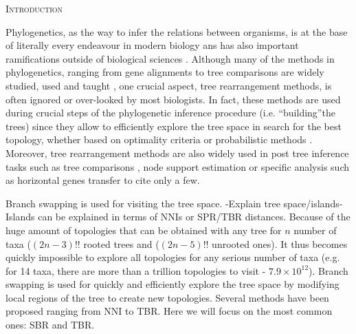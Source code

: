 \documentclass[12pt,letterpaper]{article}
\renewcommand{\section}[1]{%
\bigskip
\begin{center}
\begin{Large}
\normalfont\scshape #1
\medskip
\end{Large}
\end{center}}
\begin{document}
\section{Introduction}

Phylogenetics, as the way to infer the relations between organisms, is at the base of literally every endeavour in modern biology ans has also important ramifications outside of biological sciences \citep[e.g. linguistics;][]{Bouckaert24082012}.
Although many of the methods in phylogenetics, ranging from gene alignments \citep[e.g.][]{Tan01092015} to tree comparisons \citep[e.g.][]{kuhner2015treComparison} are widely studied, used and taught \citep{desalle2012phylogenomics}, one crucial aspect, tree rearrangement methods, is often ignored or over-looked by most biologists.
In fact, these methods are used during crucial steps of the phylogenetic inference procedure (i.e. ``building''the trees) since they allow to efficiently explore the tree space \citep[see ]{Sanderson448} in search for the best topology, whether based on optimality criteria \citep[e.g. maximum parsimony; ][]{swofford2003paup} or probabilistic methods \citep[e.g. likelihood or Bayesian; ][]{Stamatakis21012014,Ronquist2012mrbayes}.
Moreover, tree rearrangement methods are also widely used in post tree inference tasks such as tree comparisons \citep[e.g.][]{allen2001subtree,kuhner2015treComparison}, node support estimation \citep[e.g][]{goloboff2014bias} or specific analysis such as horizontal genes transfer \citep[e.g.][]{mcfadden1995something,bordewich2005computational} to cite only a few.

Branch swapping is used for visiting the tree space.
-Explain tree space/islands- Islands can be explained in terms of NNIs or SPR/TBR distances. \citep{page1993islands,morrison2007increasing}
Because of the huge amount of topologies that can be obtained with any tree for $n$ number of taxa ($(2n-3)!!$ rooted trees and ($(2n-5)!!$ unrooted ones).
It thus becomes quickly impossible to explore all topologies for any serious number of taxa (e.g. for 14 taxa, there are more than a trillion topologies to visit - $7.9\times10^{12}$).
Branch swapping is used for quickly and efficiently explore the tree space by modifying local regions of the tree to create new topologies.
Several methods have been proposed ranging from NNI to TBR.
Here we will focus on the most common ones: SBR and TBR.

\end{document}
